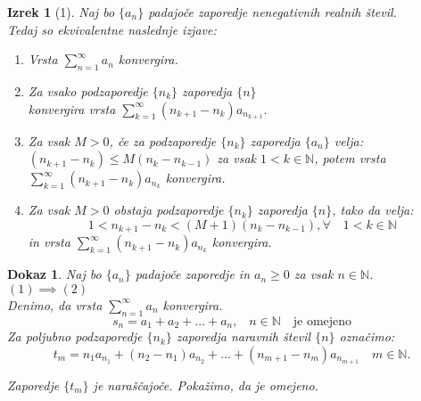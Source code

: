\documentclass{beamer}
\newtheorem{izrek}{Izrek}
\newtheorem{dokaz}{Dokaz}
\def\N{\mathbb{N}} %
\begin{document}
\begin{frame}
    \begin{izrek}[1]
        Naj bo $\{a_n\}$ padajoče zaporedje nenegativnih realnih števil. \\
        
        Tedaj so ekvivalentne naslednje izjave:
        \pause
        \begin{enumerate}
            \item Vrsta $\sum_{n = 1}^{\infty}{a_n}$ konvergira.
            \pause
            \item Za vsako podzaporedje $\{n_k\}$ zaporedja $\{n\}$ \\
            konvergira vrsta $\sum_{k = 1}^{\infty}{(n_{k+1} - n_k)a_{n_{k + 1}}}$.
            \pause
            \item Za vsak $M > 0$, če za podzaporedje $\{n_k\}$ zaporedja $\{a_n\}$ velja:\\
            $ (n_{k+1} - n_k) \leq M(n_k - n_{k - 1})$ za vsak $ 1 < k \in \N$,
            potem vrsta $\sum_{k = 1}^{\infty}{(n_{k+1} - n_k)a_{n_{k}}}$ konvergira.
            \pause
            \item Za vsak $M > 0$ obstaja podzaporedje $\{n_k\}$ zaporedja $\{n\}$, tako da velja:
            \[
                1 < n_{k+1} - n_k < (M+1)(n_k - n_{k - 1}),  \forall \quad 1 < k \in \N 
            \]
            in vrsta $\sum_{k = 1}^{\infty}{(n_{k+1} - n_k)a_{n_{k}}}$ konvergira.
        \end{enumerate}
    \end{izrek}
\end{frame}

\begin{frame}
    \begin{dokaz}
        Naj bo $\{a_n\}$ padajoče zaporedje in $a_n \geq 0$ za vsak $n \in \N$.\\
        $(1) \implies (2)$\\
        Denimo, da vrsta $\sum_{n = 1}^{\infty}{a_n}$ konvergira.
        \pause
        \[
        s_n = a_1 + a_2 + \ldots + a_n \text{,}\quad  n \in \N \quad \text{je omejeno}
        \] 
        \pause
        Za poljubno podzaporedje $\{n_k\}$ zaporedja naravnih števil $\{n\}$ označimo:
        \[
        t_m =  n_1a_{n_1} + (n_2 - n_1)a_{n_2} + \ldots + (n_{m + 1} - n_{m})a_{n_{m+ 1}} \quad m \in \N \text{.}
        \]

        \pause
        Zaporedje $\{t_m\}$ je naraščajoče.
        Pokažimo, da je omejeno.  
    \end{dokaz}    
\end{frame}
\end{document}
